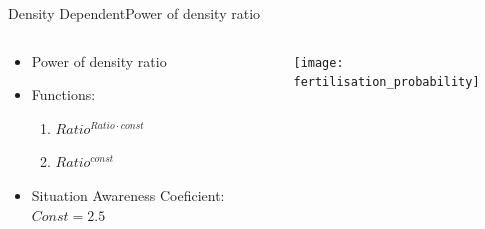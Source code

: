 \documentclass{beamer}
\begin{document}
\begin{frame}{Density Dependent}{Power of density ratio}
    \begin{columns}
        \begin{column}{0.4\textwidth}
            \begin{itemize}
                \item Power of density ratio
                \item Functions:
                    \begin{enumerate}
                        \item $ Ratio^{Ratio \cdot const} $
                        \item \sout{$Ratio^{const}$}
                    \end{enumerate}
                \item Situation Awareness Coeficient: $Const = 2.5$
            \end{itemize}
        \end{column}
        \begin{column}{0.6\textwidth}
            \texttt{[image: fertilisation\_probability]}
        \end{column}
    \end{columns}
\end{frame}
\end{document}

